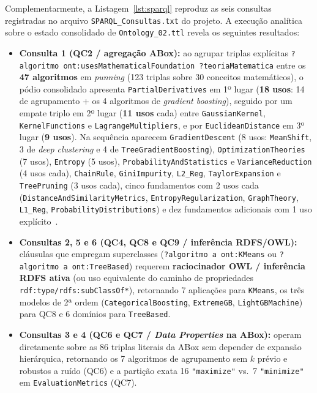 \documentclass[11pt,a4paper]{article}
\newcommand{\onto}[1]{\texttt{#1}}
\begin{document}
Complementarmente, a Listagem~\ref{lst:sparql} reproduz as seis consultas registradas no arquivo \texttt{SPARQL\_Consultas.txt} do projeto. A execução analítica sobre o estado consolidado de \texttt{Ontology\_02.ttl} revela os seguintes resultados:
\begin{itemize}[leftmargin=*,nosep]
  \item \textbf{Consulta 1 (QC2 / agregação ABox):} ao agrupar triplas explícitas \onto{?algoritmo ont:usesMathematicalFoundation ?teoriaMatematica} entre os \textbf{47 algoritmos} em \emph{punning} (123 triplas sobre 30 conceitos matemáticos), o pódio consolidado apresenta \onto{PartialDerivatives} em 1º lugar (\textbf{18 usos}: 14 de agrupamento + os 4 algoritmos de \emph{gradient boosting}), seguido por um empate triplo em 2º lugar (\textbf{11 usos} cada) entre \onto{GaussianKernel}, \onto{KernelFunctions} e \onto{LagrangeMultipliers}, e por \onto{EuclideanDistance} em 3º lugar (\textbf{9 usos}). Na sequência aparecem \onto{GradientDescent} (8 usos: \onto{MeanShift}, 3 de \emph{deep clustering} e 4 de \onto{TreeGradientBoosting}), \onto{OptimizationTheories} (7 usos), \onto{Entropy} (5 usos), \onto{ProbabilityAndStatistics} e \onto{VarianceReduction} (4 usos cada), \onto{ChainRule}, \onto{GiniImpurity}, \onto{L2\_Reg}, \onto{TaylorExpansion} e \onto{TreePruning} (3 usos cada), cinco fundamentos com 2 usos cada (\onto{DistanceAndSimilarityMetrics}, \onto{EntropyRegularization}, \onto{GraphTheory}, \onto{L1\_Reg}, \onto{ProbabilityDistributions}) e dez fundamentos adicionais com 1 uso explícito~\cite{potoniec2020dataset}.
  \item \textbf{Consultas 2, 5 e 6 (QC4, QC8 e QC9 / inferência RDFS/OWL):} cláusulas que empregam superclasses (\onto{?algoritmo a ont:KMeans} ou \onto{?algoritmo a ont:TreeBased}) requerem \textbf{raciocinador OWL / inferência RDFS ativa} (ou uso equivalente do caminho de propriedades \onto{rdf:type/rdfs:subClassOf*}), retornando 7 aplicações para \onto{KMeans}, os três modelos de 2ª ordem (\onto{CategoricalBoosting}, \onto{ExtremeGB}, \onto{LightGBMachine}) para QC8 e 6 domínios para \onto{TreeBased}.
  \item \textbf{Consultas 3 e 4 (QC6 e QC7 / \emph{Data Properties} na ABox):} operam diretamente sobre as 86 triplas literais da ABox sem depender de expansão hierárquica, retornando os 7 algoritmos de agrupamento sem $k$ prévio e robustos a ruído (QC6) e a partição exata 16 \onto{"maximize"} vs.\ 7 \onto{"minimize"} em \onto{EvaluationMetrics} (QC7).
\end{itemize}
\end{document}
